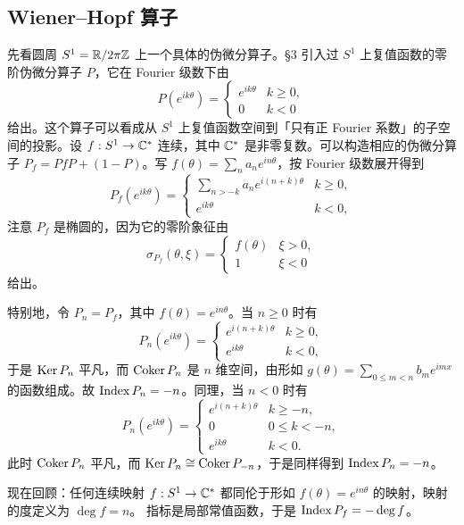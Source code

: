 \subsection{Wiener--Hopf 算子}

先看圆周 $S^1=\mathbb{R}/2\pi\mathbb{Z}$ 上一个具体的伪微分算子。§3 引入过 $S^1$ 上复值函数的零阶伪微分算子 $P$，它在 Fourier 级数下由
\[
P(e^{ik\theta})=\begin{cases} e^{ik\theta} & k\ge 0,\\ 0 & k<0 \end{cases}
\]
给出。这个算子可以看成从 $S^1$ 上复值函数空间到「只有正 Fourier 系数」的子空间的投影。设 $f:S^1\to\mathbb{C}^*$ 连续，其中 $\mathbb{C}^*$ 是非零复数。可以构造相应的伪微分算子 $P_f=PfP+(1-P)$。写 $f(\theta)=\sum_n a_n e^{in\theta}$，按 Fourier 级数展开得到
\[
P_f(e^{ik\theta})=\begin{cases} \sum_{n>-k}a_n e^{i(n+k)\theta} & k\ge 0,\\ e^{ik\theta} & k<0, \end{cases}
\]
注意 $P_f$ 是椭圆的，因为它的零阶象征由
\[
\sigma_{P_f}(\theta,\xi)=\begin{cases} f(\theta) & \xi>0,\\ 1 & \xi<0 \end{cases}
\]
给出。


特别地，令 $P_n=P_f$，其中 $f(\theta)=e^{in\theta}$。当 $n\ge 0$ 时有
\[
P_n(e^{ik\theta})=\begin{cases} e^{i(n+k)\theta} & k\ge 0,\\ e^{ik\theta} & k<0, \end{cases}
\]
于是 $\operatorname{Ker} P_n$ 平凡，而 $\operatorname{Coker} P_n$ 是 $n$ 维空间，由形如 $g(\theta)=\sum_{0\le m<n}b_m e^{imx}$ 的函数组成。故 $\operatorname{Index} P_n=-n$。同理，当 $n<0$ 时有
\[
P_n(e^{ik\theta})=\begin{cases} e^{i(n+k)\theta} & k\ge -n,\\ 0 & 0\le k<-n,\\ e^{ik\theta} & k<0. \end{cases}
\]
此时 $\operatorname{Coker} P_n$ 平凡，而 $\operatorname{Ker} P_n\cong\operatorname{Coker} P_{-n}$，于是同样得到 $\operatorname{Index} P_n=-n$。

现在回顾：任何连续映射 $f:S^1\to\mathbb{C}^*$ 都同伦于形如 $f(\theta)=e^{in\theta}$ 的映射，映射的度定义为 $\deg f=n$。%
指标是局部常值函数，于是 $\operatorname{Index} P_f=-\deg f$。

